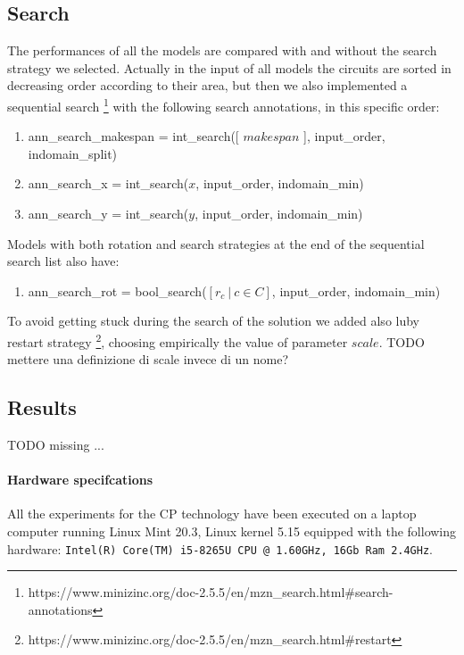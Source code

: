 
\subsection{Search}
The performances of all the models are compared with and without the search strategy we selected.
Actually in the input of all models the circuits are sorted in decreasing order according to their area,
but then we also implemented a sequential search
\footnote[2]{https://www.minizinc.org/doc-2.5.5/en/mzn\_search.html\#search-annotations}
with the following search annotations, in this specific order:
\begin{enumerate}
  \item ann\_search\_makespan = int\_search([ $makespan$ ], input\_order, indomain\_split)
  \item ann\_search\_x = int\_search($x$, input\_order, indomain\_min)
  \item ann\_search\_y = int\_search($y$, input\_order, indomain\_min)
\end{enumerate}

Models with both rotation and search strategies at the end of the sequential search
list also have:
\begin{enumerate}[resume]
  \item ann\_search\_rot = bool\_search($[r_c\ |\ c \in C]$, input\_order, indomain\_min)
\end{enumerate}

To avoid getting stuck during the search of the solution we added also luby restart strategy
\footnote[3]{https://www.minizinc.org/doc-2.5.5/en/mzn\_search.html\#restart},
choosing empirically the value of parameter $scale$.
\colorbox{BurntOrange}{TODO mettere una definizione di scale invece di un nome?}




\subsection{Results}
\colorbox{BurntOrange}{TODO missing ...} \\

\paragraph{Hardware specifcations}
All the experiments for the CP technology have been executed on a laptop computer running Linux Mint 20.3, Linux kernel 5.15
equipped with the following hardware:
\texttt{Intel(R) Core(TM) i5-8265U CPU @ 1.60GHz, 16Gb Ram 2.4GHz}.\\

